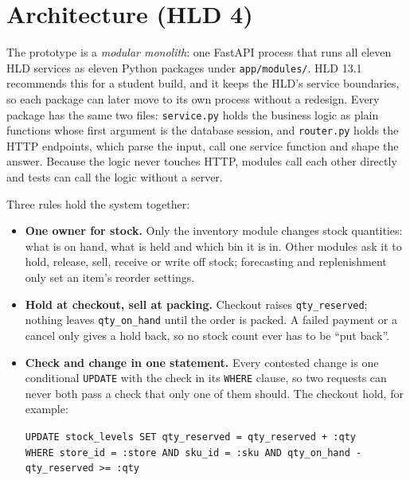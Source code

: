 
\section{Architecture (HLD 4)}

The prototype is a \emph{modular monolith}: one FastAPI process that runs all eleven HLD services as eleven Python
packages under \texttt{app/modules/}. HLD 13.1 recommends this for a student build, and it keeps the HLD's service
boundaries, so each package can later move to its own process without a redesign. Every package has the same two
files: \texttt{service.py} holds the business logic as plain functions whose first argument is the database session,
and \texttt{router.py} holds the HTTP endpoints, which parse the input, call one service function and shape the
answer. Because the logic never touches HTTP, modules call each other directly and tests can call the logic without
a server.

Three rules hold the system together:
\begin{itemize}
  \item \textbf{One owner for stock.} Only the inventory module changes stock quantities: what is on hand, what is
    held and which bin it is in. Other modules ask it to hold, release, sell, receive or write off stock; forecasting
    and replenishment only set an item's reorder settings.
  \item \textbf{Hold at checkout, sell at packing.} Checkout raises \texttt{qty\_reserved}; nothing leaves
    \texttt{qty\_on\_hand} until the order is packed. A failed payment or a cancel only gives a hold back, so no stock
    count ever has to be ``put back''.
  \item \textbf{Check and change in one statement.} Every contested change is one conditional \texttt{UPDATE} with
    the check in its \texttt{WHERE} clause, so two requests can never both pass a check that only one of them should.
    The checkout hold, for example:
    \begin{center}\small
      \verb|UPDATE stock_levels SET qty_reserved = qty_reserved + :qty|\\
      \verb|WHERE store_id = :store AND sku_id = :sku AND qty_on_hand - qty_reserved >= :qty|
    \end{center}
\end{itemize}

